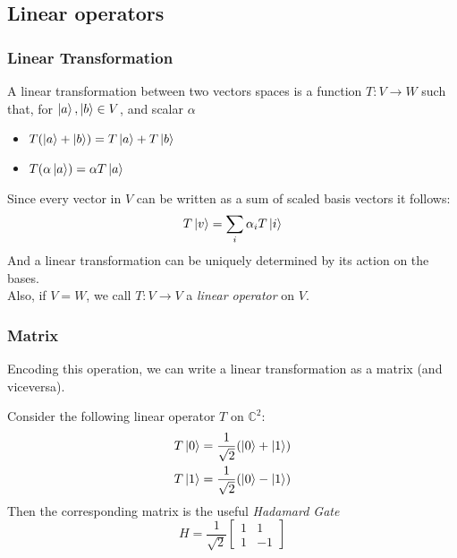 \documentclass{beamer}
\begin{document}
\subsection{Linear operators}
\begin{frame}
    \frametitle{Linear Transformation}
    A linear transformation between two vectors spaces is a function $T: V \to W$ such that, for $\ket{a}, \ket{b} \in V$, and scalar $\alpha$
    \begin{itemize}
        \item $T(\ket{a} + \ket{b}) = T\ket{a} + T\ket{b}$
        \item $T(\alpha\ket{a})  = \alpha T\ket{a}$
    \end{itemize}
    Since every vector in $V$ can be written as a sum of scaled basis vectors it follows:
    \[ T\ket{v} = \sum_i \alpha_i T\ket{i}  \]
    And a linear transformation can be uniquely determined by its action on the bases. \\
    Also, if $V = W$, we call $T: V \to V$ a \textit{linear operator} on $V$.
\end{frame}
\begin{frame}
    \frametitle{Matrix}
    Encoding this operation, we can write a linear transformation as a matrix (and viceversa).
    \begin{example}
        Consider the following linear operator $T$ on $\mathbb{C}^2$:
        \begin{align}
            T\ket{0} & = \frac{1}{\sqrt{2}}(\ket{0} + \ket{1}) \\
            T\ket{1} & = \frac{1}{\sqrt{2}}(\ket{0} - \ket{1})
        \end{align}
        Then the corresponding matrix is the useful \textit{Hadamard Gate}
        \begin{equation}
            \label{Hadamard}
            H = \frac{1}{\sqrt{2}}
            \begin{bmatrix}
                1 & 1  \\
                1 & -1
            \end{bmatrix}
        \end{equation}
    \end{example}
\end{frame}
\end{document}
